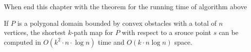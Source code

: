 When end this chapter with the theorem for the running time of algorithm above

\begin{theorem} 
If $P$ is a polygonal domain bounded by convex obstacles with a total of $n$ vertices, the shortest $k$-path map for $P$ with respect to a srouce point $s$ can be computed in $O(k^2 \cdot n \cdot \log n)$ time and $O(k \cdot n \log n)$ space.
\end{theorem}
